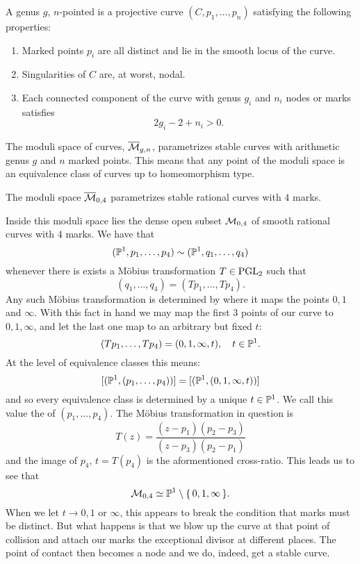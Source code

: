 \documentclass[12pt]{memoir}
\begin{document}
\begin{Def}
    A genus $g$, $n$-pointed  is a projective curve $(C,p_1,\dots,p_n)$ satisfying the following properties:
    \begin{enumerate}
        \item Marked points $p_i$ are all distinct and lie in the smooth locus of the curve.
        \item Singularities of $C$ are, at worst, nodal.
        \item Each connected component of the curve with genus $g_i$ and $n_i$ nodes or marks satisfies 
        $$2g_i-2+n_i>0.$$
    \end{enumerate}
\end{Def}

The moduli space of curves, $\overline{\mathcal{M}}_{g,n}$, parametrizes stable curves with arithmetic genus $g$ and $n$ marked points. This means that any point of the moduli space is an equivalence class of curves up to homeomorphism type. 

\begin{Ex}
The moduli space $\overline{\mathcal{M}}_{0,4}$ parametrizes stable rational curves with $4$ marks.\par 
Inside this moduli space lies the dense open subset $\mathcal{M}_{0,4}$ of smooth rational curves with $4$ marks. We have that 
$$(\mathbb{P}^1,p_1,\dots,p_4)\sim(\mathbb{P}^1,q_1,\dots,q_4)$$
whenever there is exists a Möbius transformation $T\in\operatorname{PGL}_2$ such that 
$$(q_1,\dots,q_4)=(Tp_1,\dots,Tp_4).$$
Any such Möbius transformation is determined by where it maps the points $0,1$ and $\infty$. With this fact in hand we may map the first $3$ points of our curve to $0,1,\infty$, and let the last one map to an arbitrary but fixed $t$:
$$(Tp_1,\dots,Tp_4)=(0,1,\infty,t),\quad t\in\mathbb{P}^1.$$
At the level of equivalence classes this means:
$$[(\mathbb{P}^1,(p_1,\dots,p_4))]=[(\mathbb{P}^1,(0,1,\infty,t))]$$
and so every equivalence class is determined by a unique $t\in\mathbb{P}^1$. We call this value the  of $(p_1,\dots,p_4)$. The Möbius transformation in question is
$$T(z)=\frac{(z-p_1)(p_2-p_3)}{(z-p_3)(p_2-p_1)}$$
and the image of $p_4$, $t=T(p_4)$ is the aformentioned cross-ratio. This leads us to see that 
$$\mathcal{M}_{0,4}\simeq\mathbb{P}^1\setminus\{\,0,1,\infty\,\}.$$
When we let $t\to 0,1$ or $\infty$, this appears to break the condition that marks must be distinct. But what happens is that we blow up the curve at that point of collision and attach our marks the exceptional divisor at different places. The point of contact then becomes a node and we do, indeed, get a stable curve. 
\end{Ex}
\end{document}

